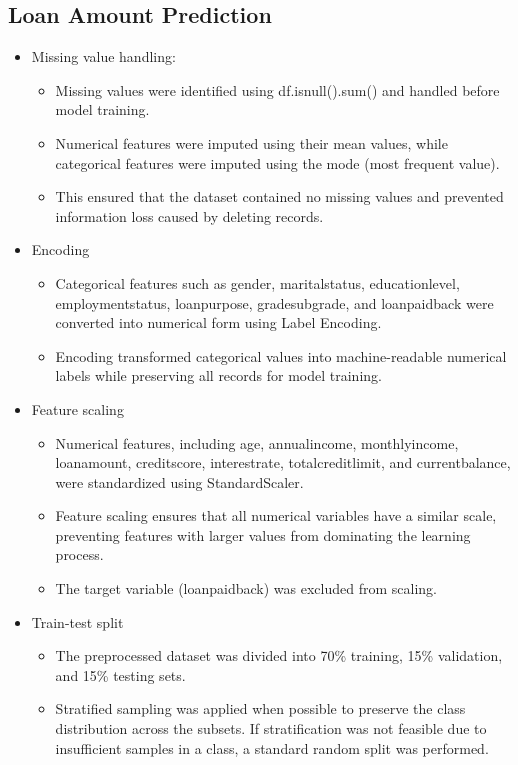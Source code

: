 \documentclass[12pt,a4paper]{article}
\begin{document}
\subsection*{Loan Amount Prediction}
\begin{itemize}
\item Missing value handling:
\begin{itemize}
\item Missing values were identified using df.isnull().sum() and handled before model training.
\item Numerical features were imputed using their mean values, while categorical features were imputed using the mode (most frequent value).
\item This ensured that the dataset contained no missing values and prevented information loss caused by deleting records.
\end{itemize}
\item Encoding
\begin{itemize}
\item Categorical features such as gender, maritalstatus, educationlevel, employmentstatus, loanpurpose, gradesubgrade, and loanpaidback were converted into numerical form using Label Encoding.
\item Encoding transformed categorical values into machine-readable numerical labels while preserving all records for model training.
\end{itemize}
\item Feature scaling
\begin{itemize}
\item Numerical features, including age, annualincome, monthlyincome, loanamount, creditscore, interestrate, totalcreditlimit, and currentbalance, were standardized using StandardScaler.
\item Feature scaling ensures that all numerical variables have a similar scale, preventing features with larger values from dominating the learning process.
\item The target variable (loanpaidback) was excluded from scaling.
\end{itemize}
\item Train-test split
\begin{itemize}
\item The preprocessed dataset was divided into 70\% training, 15\% validation, and 15\% testing sets.
\item Stratified sampling was applied when possible to preserve the class distribution across the subsets. If stratification was not feasible due to insufficient samples in a class, a standard random split was performed.
\end{itemize}
\end{itemize}
\end{document}
